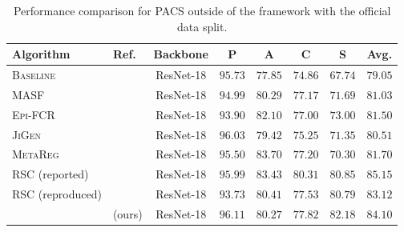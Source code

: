 \begin{table*}[t]
\small
\centering
\begin{tabular}{llcccccc}
\toprule
\textbf{Algorithm} & \textbf{Ref.} & \textbf{Backbone} & \textbf{P} & \textbf{A} & \textbf{C} & \textbf{S} &  \textbf{Avg.} \\
\midrule
\textsc{Baseline}		&\cite{CarlucciDBCT19}				&	ResNet-18	&	$95.73$		&	$77.85$		&	$74.86$		&	$67.74$		&	$79.05$		 \\
\textsc{MASF}		&\cite{DouCKG19}					&	ResNet-18	&	$94.99$		&	$80.29$		&	$77.17$		&	$71.69$		&	$81.03$		 \\
\textsc{Epi-FCR}		&\cite{LiZYLSH19}					&	ResNet-18	&	$93.90$		&	$82.10$		&	$77.00$		&	$73.00$		&	$81.50$		 \\
\textsc{JiGen}		&\cite{CarlucciDBCT19}				&	ResNet-18	&	$96.03$		&	$79.42$		&	$75.25$		&	$71.35$		&	$80.51$		\\
\textsc{MetaReg}		& \cite{BalajiSC18}					&	ResNet-18	&	$95.50$		&	$83.70$		&	$77.20$		&	$70.30$		&	$81.70$		\\
\textsc{RSC} (reported)	& \cite{huang2020selfchallenging}		&	ResNet-18	&	$95.99$		&	$83.43$		&	$80.31$		&	$80.85$		&	$85.15$		\\
\textsc{RSC} (reproduced) & \cite{huang2020selfchallenging}		&	ResNet-18	&	$93.73$		&	$80.41$		&	$77.53$		&	$80.79$		&	$83.12$		\\
\divcams			&     (ours)						&	ResNet-18	&	$96.11$		&	$80.27$		&	$77.82$		&	$82.18$		&	$84.10$		\\
\bottomrule
\end{tabular}
\caption[Performance comparison for official PACS splits outside of \domainbed]{Performance comparison for PACS outside of the \domainbed framework with the official data split.}
\label{tab:official}
\end{table*}

